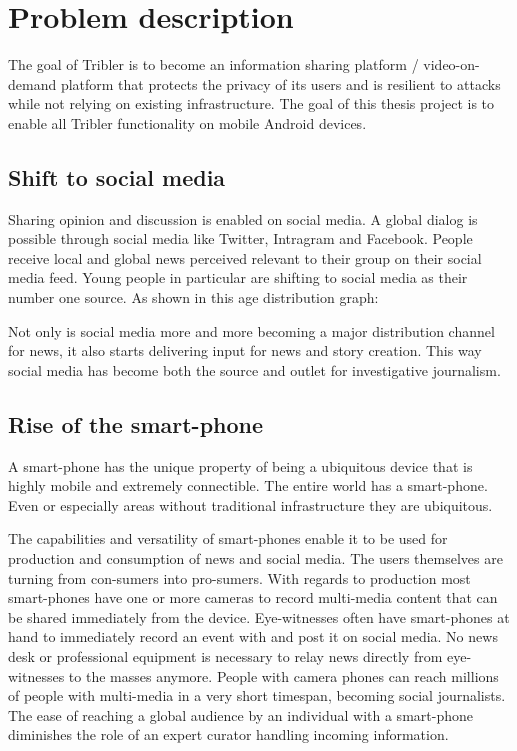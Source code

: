 \chapter{Problem description}

The goal of Tribler is to become an information sharing platform / video-on-demand platform that protects the privacy of its users and is resilient to attacks while not relying on existing infrastructure.
The goal of this thesis project is to enable all Tribler functionality on mobile Android devices.


\section{Shift to social media}
Sharing opinion and discussion is enabled on social media.
A global dialog is possible through social media like Twitter, Intragram and Facebook.
People receive local and global news perceived relevant to their group on their social media feed.
Young people in particular are shifting to social media as their number one source. \cite{reuters_social_media}
As shown in this age distribution graph:

Not only is social media more and more becoming a major distribution channel for news, it also starts delivering input for news and story creation.
This way social media has become both the source and outlet for investigative journalism.


\section{Rise of the smart-phone}
A smart-phone has the unique property of being a ubiquitous device that is highly mobile and extremely connectible.
The entire world has a smart-phone.
Even or especially areas without traditional infrastructure they are ubiquitous.

The capabilities and versatility of smart-phones enable it to be used for production and consumption of news and social media.
The users themselves are turning from con-sumers into pro-sumers.
With regards to production most smart-phones have one or more cameras to record multi-media content that can be shared immediately from the device.
Eye-witnesses often have smart-phones at hand to immediately record an event with and post it on social media.
No news desk or professional equipment is necessary to relay news directly from eye-witnesses to the masses anymore.
People with camera phones can reach millions of people with multi-media in a very short timespan, becoming social journalists.
The ease of reaching a global audience by an individual with a smart-phone diminishes the role of an expert curator handling incoming information.

